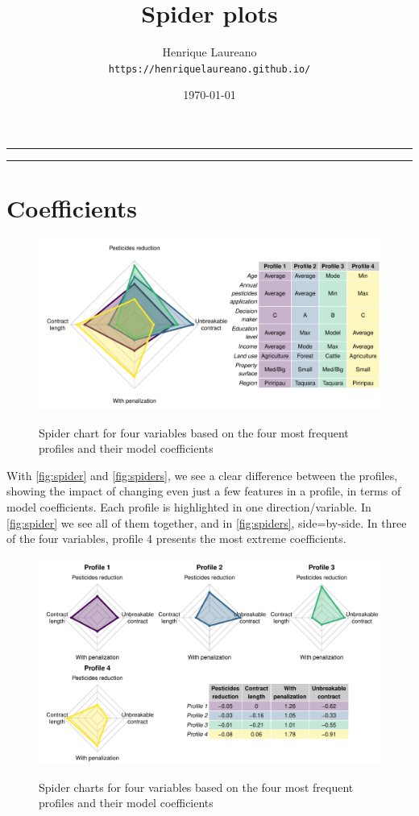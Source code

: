 \documentclass[12pt]{article}
\title{Spider plots}
\date{\today}
\author{Henrique Laureano\\
        \texttt{https://henriquelaureano.github.io/}}
\newcommand{\horrule}[1]{\rule{\linewidth}{#1}}
\begin{document}
\maketitle
\thispagestyle{empty}

\noindent \horrule{.5pt} \vspace{-.95cm} \tableofcontents \noindent \horrule{.5pt}

\section*{Coefficients}

\begin{figure}[H]
 \centering
 \includegraphics[width=\textwidth]{figures/spider.pdf}\\
 \caption{Spider chart for four variables based on the four most
          frequent profiles and their model coefficients}
 \label{fig:spider}
\end{figure}

With \autoref{fig:spider} and \autoref{fig:spiders}, we see a clear
difference between the profiles, showing the impact of changing even
just a few features in a profile, in terms of model coefficients. Each
profile is highlighted in one direction/variable. In
\autoref{fig:spider} we see all of them together, and in
\autoref{fig:spiders}, side=by-side. In three of the four variables,
profile 4 presents the most extreme coefficients.

\begin{figure}[H]
 \centering
 \includegraphics[width=\textwidth]{figures/spiders.pdf}\\
 \caption{Spider charts for four variables based on the four most
          frequent profiles and their model coefficients}
 \label{fig:spiders}
\end{figure}
\end{document}
